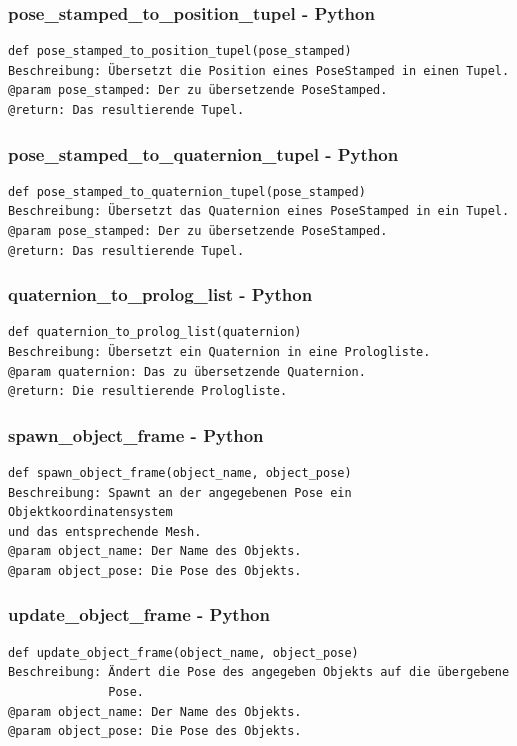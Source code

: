 \documentclass{suturo}
\begin{document}
\subsubsection{pose\_stamped\_to\_position\_tupel - Python}
\begin{verbatim}
def pose_stamped_to_position_tupel(pose_stamped)
Beschreibung: Übersetzt die Position eines PoseStamped in einen Tupel.
@param pose_stamped: Der zu übersetzende PoseStamped.
@return: Das resultierende Tupel.
\end{verbatim}

\subsubsection{pose\_stamped\_to\_quaternion\_tupel - Python}
\begin{verbatim}
def pose_stamped_to_quaternion_tupel(pose_stamped)
Beschreibung: Übersetzt das Quaternion eines PoseStamped in ein Tupel.
@param pose_stamped: Der zu übersetzende PoseStamped.
@return: Das resultierende Tupel.
\end{verbatim}

\subsubsection{quaternion\_to\_prolog\_list - Python}
\begin{verbatim}
def quaternion_to_prolog_list(quaternion)
Beschreibung: Übersetzt ein Quaternion in eine Prologliste.
@param quaternion: Das zu übersetzende Quaternion.
@return: Die resultierende Prologliste.
\end{verbatim}

\subsubsection{spawn\_object\_frame - Python}
\begin{verbatim}
def spawn_object_frame(object_name, object_pose)
Beschreibung: Spawnt an der angegebenen Pose ein Objektkoordinatensystem 
und das entsprechende Mesh.
@param object_name: Der Name des Objekts.
@param object_pose: Die Pose des Objekts.
\end{verbatim}

\subsubsection{update\_object\_frame - Python}
\begin{verbatim}
def update_object_frame(object_name, object_pose)
Beschreibung: Ändert die Pose des angegeben Objekts auf die übergebene
              Pose.
@param object_name: Der Name des Objekts.
@param object_pose: Die Pose des Objekts.
\end{verbatim}
\end{document}
